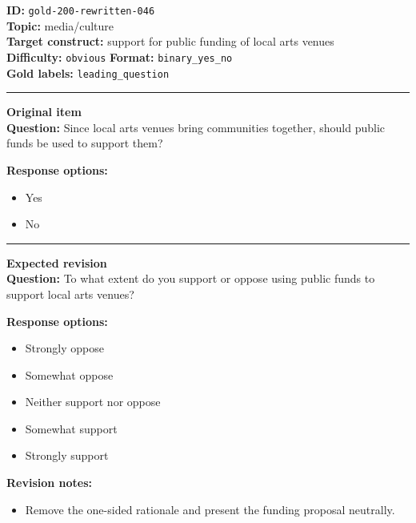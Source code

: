 \documentclass[10pt,a4paper]{article}
\newcommand{\sectionline}{\vspace{0.15em}\hrule\vspace{0.35em}}
\begin{document}
\begin{tcolorbox}[colframe=FlawRed,colback=white,colbacktitle=FlawRed!9,coltitle=black,title={Item 046\hfill Flawed item}]
\textbf{ID:} \texttt{gold-200-rewritten-046}\\
\textbf{Topic:} media/culture\\
\textbf{Target construct:} support for public funding of local arts venues\\
\textbf{Difficulty:} \texttt{obvious} \quad \textbf{Format:} \texttt{binary\_yes\_no}\\
\textbf{Gold labels:} \texttt{leading\_question}\\
\sectionline
\textbf{Original item}\\
\textbf{Question:} Since local arts venues bring communities together, should public funds be used to support them?
\par\textbf{Response options:}
\begin{itemize}
\item Yes
\item No
\end{itemize}
\sectionline
\textbf{Expected revision}\\
\textbf{Question:} To what extent do you support or oppose using public funds to support local arts venues?
\par\textbf{Response options:}
\begin{itemize}
\item Strongly oppose
\item Somewhat oppose
\item Neither support nor oppose
\item Somewhat support
\item Strongly support
\end{itemize}
\par\textbf{Revision notes:}
\begin{itemize}
\item Remove the one-sided rationale and present the funding proposal neutrally.
\end{itemize}
\end{tcolorbox}
\end{document}
